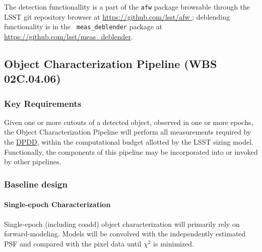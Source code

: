 \documentclass[12pt]{article}
\newcommand{\ds}[2]{{\color{blue} \href{https://docushare.lsstcorp.org/docushare/dsweb/Get/#1}{#2}}\xspace}
\newcommand{\DPDD}{\ds{LSE-163}{DPDD}}
\newcommand{\wbsPSF}{WBS 02C.04.03}
\newcommand{\wbsObjChar}{WBS 02C.04.06}
\begin{document}
The detection functionallity is a part of the {\tt afw} package
browsable through the LSST git repository browser at
\url{https://github.com/lsst/afw }; deblending functionality is in the {\tt
meas\_deblender} package at \url{https://github.com/lsst/meas_deblender}.

\clearpage

\subsection{Object Characterization Pipeline (\wbsObjChar)}

\subsubsection{Key Requirements}

Given one or more cutouts of a detected object, observed in one or more epochs, the Object Characterization Pipeline will perform all measurements required by the \DPDD, within the computational budget allotted by the LSST sizing model.
\\

Functionally, the components of this pipeline may be incorporated into or invoked by other pipelines.

\subsubsection{Baseline design}

\paragraph{Single-epoch Characterization}

Single-epoch (including coadd) object characterization will primarily rely on forward-modeling. Models will be convolved with the independently estimated PSF and compared with the pixel data until $\chi^2$ is minimized. %

\end{document}
